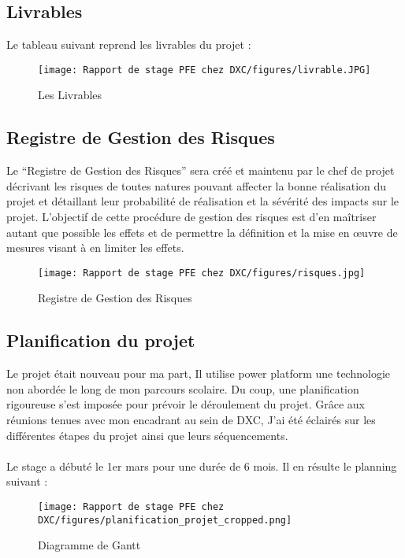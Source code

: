 \subsection{Livrables}
Le tableau suivant reprend les livrables du projet :

\begin{figure}[!h]
    \centering
    \texttt{[image: Rapport de stage PFE chez DXC/figures/livrable.JPG]}
    \caption{Les Livrables}
\end{figure}

\subsection{Registre de Gestion des Risques} 

Le “Registre de Gestion des Risques” sera créé et maintenu par le chef de projet
décrivant les risques de toutes natures pouvant affecter la bonne réalisation du projet et
détaillant leur probabilité de réalisation et la sévérité des impacts sur le projet. L’objectif de cette procédure de gestion des risques est d’en maîtriser autant que possible les effets et de permettre la définition et la mise en œuvre de mesures visant à en limiter les effets.

\newpage
\begin{figure}[!h]
    \centering
    \texttt{[image: Rapport de stage PFE chez DXC/figures/risques.jpg]}
    \caption{Registre de Gestion des Risques}
\end{figure}

\subsection{Planification du projet}

Le projet était nouveau pour ma part, Il utilise power platform une technologie non abordée le long de mon parcours scolaire. Du coup, une planification rigoureuse s’est imposée pour prévoir le déroulement du projet. Grâce aux réunions tenues avec mon encadrant au sein de DXC, J'ai été éclairés sur les différentes étapes du projet ainsi que leurs séquencements.
\\\\
Le stage a débuté le 1er mars pour une durée de 6 mois. Il en résulte le planning
suivant :
\\
\begin{figure}[!h]
    \centering
    \texttt{[image: Rapport de stage PFE chez DXC/figures/planification\_projet\_cropped.png]}
    \caption{Diagramme de Gantt}
\end{figure}

